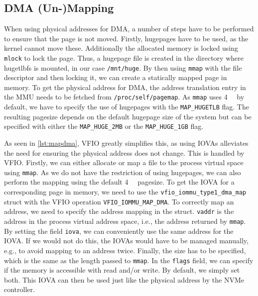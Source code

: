 \subsection{DMA (Un-)Mapping}\label{sec:dmamapping}
When using physical addresses for DMA, a number of steps have to be performed to ensure that the page is not moved. Firstly, hugepages have to be used, as the kernel cannot move these. Additionally the allocated memory is locked using \texttt{mlock} to lock the page. Thus, a hugepage file is created in the directory where hugetlbfs is mounted, in our case \texttt{/mnt/huge}. By then using \texttt{mmap} with the file descriptor and then locking it, we can create a statically mapped page in memory. To get the physical address for DMA, the address translation entry in the MMU needs to be fetched from \texttt{/proc/self/pagemap}. As \texttt{mmap} uses \qty{4}{\kibi\byte} by default, we have to specify the use of hugepages with the \texttt{MAP\_HUGETLB} flag. The resulting pagesize depends on the default hugepage size of the system but can be specified with either the \texttt{MAP\_HUGE\_2MB} or the \texttt{MAP\_HUGE\_1GB} flag.

As seen in \autoref{lst:mapdma}, VFIO greatly simplifies this, as using IOVAs alleviates the need for ensuring the physical address does not change. This is handled by VFIO. Firstly, we can either allocate or map a file to the process virtual space using \texttt{mmap}. As we do not have the restriction of using hugepages, we can also perform the mapping using the default \qty{4}{\kibi\byte} pagesize.
To get the IOVA for a corresponding page in memory, we need to use the \texttt{vfio\_iommu\_type1\_dma\_map} struct with the VFIO operation \texttt{VFIO\_IOMMU\_MAP\_DMA}. To correctly map an address, we need to specify the address mapping in the struct. \texttt{vaddr} is the address in the process virtual address space, i.e., the address returned by \texttt{mmap}. By setting the field \texttt{iova}, we can conveniently use the same address for the IOVA. If we would not do this, the IOVAs would have to be managed manually, e.g., to avoid mapping to an address twice. Finally, the size has to be specified, which is the same as the length passed to \texttt{mmap}. In the \texttt{flags} field, we can specify if the memory is accessible with read and/or write. By default, we simply set both. This IOVA can then be used just like the physical address by the NVMe controller.

